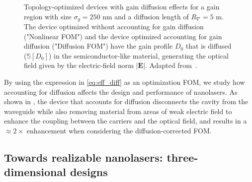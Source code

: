 \begin{figure}[tb]
    \centering
    \caption{Topology-optimized devices with gain diffusion effects for a gain region with size $\sigma_g=250$ nm and a diffusion length of $R_\nabla=5$ \textmu m. The device optimized without accounting for gain diffusion ("Nonlinear FOM") and the device optimized accounting for gain diffusion ("Diffusion FOM") have the gain profile $D_0$ that is diffused ($\mathbb{S}[D_0]$)
    in the semiconductor-like material, generating the optical field given by the electric-field norm $\vert \mathbf{E} \vert$. Adapted from~\cite{ownpub4}.}
    \label{fig:laser_diff}
\end{figure}

By using the expression in \eqref{eq:eff_diff} as an optimization FOM, we study how accounting for diffusion
affects the design and performance of nanolasers. As shown in , the device that accounts for diffusion disconnects the cavity from the waveguide while also removing
material from areas of weak electric field to 
enhance the coupling between the carriers and the optical field, and results in a $\approx 2\times$ enhancement when considering the diffusion-corrected FOM. 

\subsection*{Towards realizable nanolasers: three-dimensional designs}

